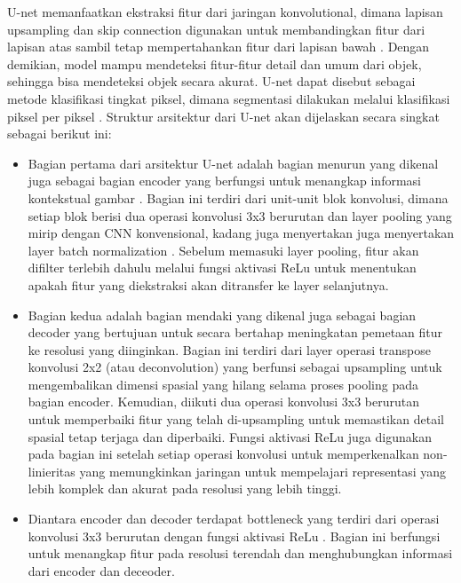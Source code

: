 \noindent U-net memanfaatkan ekstraksi fitur dari jaringan konvolutional, dimana lapisan upsampling dan skip connection digunakan untuk membandingkan fitur dari lapisan atas sambil tetap mempertahankan fitur dari lapisan bawah \cite{huang_fully_2022}. Dengan demikian, model mampu mendeteksi fitur-fitur detail dan umum dari objek, sehingga bisa mendeteksi objek secara akurat. U-net dapat disebut sebagai metode klasifikasi tingkat piksel, dimana segmentasi dilakukan melalui klasifikasi piksel per piksel \cite{siddique_u-net_2020}. Struktur arsitektur dari U-net akan dijelaskan secara singkat sebagai berikut ini:

\begin{itemize}
	\item Bagian pertama dari arsitektur U-net adalah bagian menurun yang dikenal juga sebagai bagian encoder yang berfungsi untuk menangkap informasi kontekstual gambar \cite{azad_medical_2022}. Bagian ini terdiri dari unit-unit blok konvolusi, dimana setiap blok berisi dua operasi konvolusi 3x3 berurutan dan layer pooling yang mirip dengan CNN konvensional, kadang juga menyertakan juga menyertakan layer batch normalization \cite{younisse_fine-tuning_2023}. Sebelum memasuki layer pooling, fitur akan difilter terlebih dahulu melalui fungsi aktivasi ReLu untuk menentukan apakah fitur yang diekstraksi akan ditransfer ke layer selanjutnya.
	
	\item Bagian kedua adalah bagian mendaki yang dikenal juga sebagai bagian decoder yang bertujuan untuk secara bertahap meningkatan pemetaan fitur ke resolusi yang diinginkan\cite{siddique_u-net_2020}. Bagian ini terdiri dari layer operasi transpose konvolusi 2x2 (atau deconvolution) yang berfunsi sebagai upsampling untuk mengembalikan dimensi spasial yang hilang selama proses pooling pada bagian encoder. Kemudian, diikuti dua operasi konvolusi 3x3 berurutan untuk memperbaiki fitur yang telah di-upsampling untuk memastikan detail spasial tetap terjaga dan diperbaiki\cite{purushothaman_image_2022}. Fungsi aktivasi ReLu juga digunakan pada bagian ini setelah setiap operasi konvolusi untuk memperkenalkan non-linieritas yang memungkinkan jaringan untuk mempelajari representasi yang lebih komplek dan akurat pada resolusi yang lebih tinggi\cite{huang_fully_2022}.
	
	\item Diantara encoder dan decoder terdapat bottleneck yang terdiri dari operasi konvolusi 3x3 berurutan dengan fungsi aktivasi ReLu \cite{azad_medical_2022}. Bagian ini berfungsi untuk menangkap fitur pada resolusi terendah dan menghubungkan informasi dari encoder dan deceoder.
	

\end{itemize}
